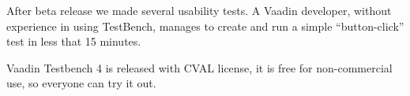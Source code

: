  After beta release we made several usability tests.
A Vaadin developer, without experience in using TestBench, manages to create and 
run a simple ``button-click'' test in less that 15 minutes. 

Vaadin Testbench 4 is released with CVAL license, it is free for non-commercial
use, so everyone can try it out.
